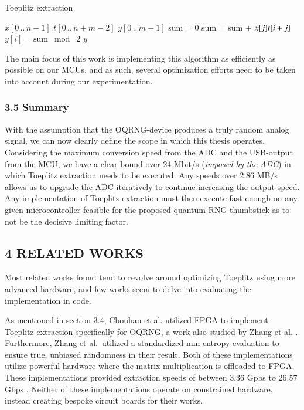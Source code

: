 \documentclass{sigchi}
\begin{document}
\begin{algorithm}[ht] \caption{Toeplitz extraction}\label{alg:bit-conv}
\begin{algorithmic}[1] \REQUIRE \(x[0\,..\,n-1]\)  \REQUIRE \(t[0\,..\,n+m-2]\)  \ENSURE \(y[0\,..\,m-1]\) 
 \STATE sum = 0  \STATE
sum = sum + \(x[j] \* t[i + j]\) \ENDFOR \STATE \(y[i] =
\mathrm{sum}\;\bmod\;2\) \ENDFOR \RETURN \(y\) \end{algorithmic} \end{algorithm}

The main focus of this work is implementing this algorithm as efficiently as possible on our MCUs, and as such, several optimization efforts need to be taken into account during our experimentation.

\subsubsection{3.5 Summary}\label{summary}

With the assumption that the OQRNG-device produces a truly random analog signal, we can now clearly define the scope in which this thesis operates. Considering the maximum conversion speed from the ADC and the USB-output from the MCU, we have a clear bound over 24 Mbit/s (\emph{imposed by the ADC}) in which Toeplitz extraction needs to be executed. Any speeds over 2.86 MB/s allows us to upgrade the ADC iteratively to continue increasing the output speed. Any implementation of Toeplitz extraction must then execute fast enough on any given microcontroller feasible for the proposed quantum RNG-thumbstick as to not be the decisive limiting factor.

\subsection{4 RELATED WORKS}\label{related-works}

Most related works found tend to revolve around optimizing Toeplitz using more advanced hardware, and few works seem to delve into evaluating the implementation in code.

As mentioned in section 3.4, Chouhan et al. \cite{toeplitz-desc} utilized FPGA to implement Toeplitz extraction specifically for OQRNG, a work also studied by Zhang et al. \cite{toeplitz}. Furthermore, Zhang et al.~utilized a standardized min-entropy evaluation to ensure true, unbiased randomness in their result. Both of these implementations utilize powerful hardware where the matrix multiplication is offloaded to FPGA. These implementations provided extraction speeds of between 3.36 Gpbs \cite{toeplitz} to 26.57 Gbps \cite{toeplitz-desc}. Neither of these implementations operate on constrained hardware, instead creating bespoke circuit boards for their works.
\end{document}
